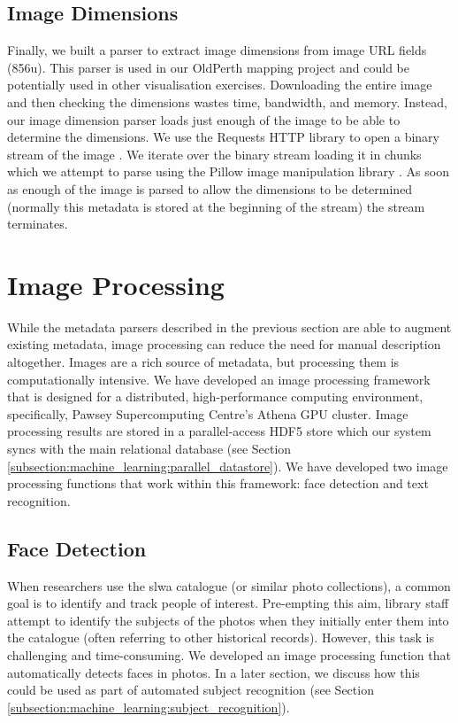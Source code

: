 \documentclass[10pt, a4paper]{article}
\begin{document}
\subsection{Image Dimensions}
\label{subsection:metadata_parsing:image_dimensions}
Finally, we built a parser to extract image dimensions from image URL fields (856u). This parser is used in our OldPerth mapping project and could be potentially used in other visualisation exercises. Downloading the entire image and then checking the dimensions wastes time, bandwidth, and memory. Instead, our image dimension parser loads just enough of the image to be able to determine the dimensions. We use the Requests HTTP library to open a binary stream of the image \cite{requests}. We iterate over the binary stream loading it in chunks which we attempt to parse using the Pillow image manipulation library \cite{pillow}. As soon as enough of the image is parsed to allow the dimensions to be determined (normally this metadata is stored at the beginning of the stream) the stream terminates.

\section{Image Processing}
\label{section:image_processing}

\label{subsection:image_processing:introduction}
While the metadata parsers described in the previous section are able to augment existing metadata, image processing can reduce the need for manual description altogether. Images are a rich source of metadata, but processing them is computationally intensive. We have developed an image processing framework that is designed for a distributed, high-performance computing environment, specifically, Pawsey Supercomputing Centre’s Athena GPU cluster. Image processing results are stored in a parallel-access HDF5 store which our system syncs with the main relational database (see Section \ref{subsection:machine_learning:parallel_datastore}). We have developed two image processing functions that work within this framework: face detection and text recognition.

\subsection{Face Detection}
\label{subsection:image_processing:face_detection}
When researchers use the \Gls{slwa} catalogue (or similar photo collections), a common goal is to identify and track people of interest. Pre-empting this aim, library staff attempt to identify the subjects of the photos when they initially enter them into the catalogue (often referring to other historical records). However, this task is challenging and time-consuming. We developed an image processing function that automatically detects faces in photos. In a later section, we discuss how this could be used as part of automated subject recognition (see Section \ref{subsection:machine_learning:subject_recognition}).
\end{document}

